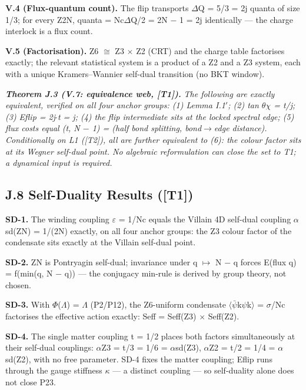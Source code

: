 \documentclass[11pt,letterpaper]{article}
\begin{document}
\noindent \textbf{V.4 (Flux-quantum count). }The flip transports $\Delta$Q = 5/3 = 2j quanta of size 1/3; for every Z2N, quanta = Nc$\Delta$Q/2 = 2N $-$ 1 = 2j identically --- the charge interlock is a flux count.

\noindent \textbf{V.5 (Factorisation). }Z6 $\cong$ Z3 $\times$ Z2 (CRT) and the charge table factorises exactly; the relevant statistical system is a product of a Z2 and a Z3 system, each with a unique Kramers--Wannier self-dual transition (no BKT window).

\noindent \textbf{\textit{Theorem J.3 (V.7: equivalence web, [T1]). }}\textit{The following are exactly equivalent, verified on all four anchor groups: (1) Lemma I.1$'$; (2) tan $\theta$$\chi$ = t/j; (3) Eflip = 2j$\cdot$t = j; (4) the flip intermediate sits at the locked spectral edge; (5) flux costs equal (t, N $-$ 1) = (half bond splitting, bond$\to$edge distance). Conditionally on L1 ([T2]), all are further equivalent to (6): the colour factor sits at its Wegner self-dual point. No algebraic reformulation can close the set to T1; a dynamical input is required.}

\subsection*{J.8  Self-Duality Results ([T1])}

\noindent \textbf{SD-1. }The winding coupling $\varepsilon$ = 1/Nc equals the Villain 4D self-dual coupling $\alpha$sd(ZN) = 1/(2N) exactly, on all four anchor groups: the Z3 colour factor of the condensate sits exactly at the Villain self-dual point.

\noindent \textbf{SD-2. }ZN is Pontryagin self-dual; invariance under q $\mapsto$ N $-$ q forces E(flux q) = f(min(q, N $-$ q)) --- the conjugacy min-rule is derived by group theory, not chosen.

\noindent \textbf{SD-3. }With $\Phi$($\Lambda$) = $\Lambda$ (P2/P12), the Z6-uniform condensate $\langle$$\bar{\psi}$k$\psi$k$\rangle$ = $\sigma$/Nc factorises the effective action exactly: Seff = Seff(Z3) $\times$ Seff(Z2).

\noindent \textbf{SD-4. }The single matter coupling t = 1/2 places both factors simultaneously at their self-dual couplings: $\alpha$Z3 = t/3 = 1/6 = $\alpha$sd(Z3), $\alpha$Z2 = t/2 = 1/4 = $\alpha$sd(Z2), with no free parameter. SD-4 fixes the matter coupling; Eflip runs through the gauge stiffness $\kappa$ --- a distinct coupling --- so self-duality alone does not close P23.
\end{document}
